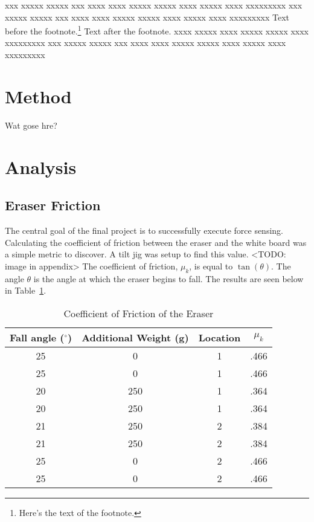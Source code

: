 \documentclass[12pt]{article}
\begin{document}
    xxx xxxxx xxxxx xxx xxxx xxxx xxxxx xxxxx xxxx xxxxx xxxx xxxxxxxxx
    xxx xxxxx xxxxx xxx xxxx xxxx xxxxx xxxxx xxxx xxxxx xxxx xxxxxxxxx
    Text before the footnote.\footnote{Here's the text of the footnote.}
    Text after the footnote. xxxx xxxxx xxxx xxxxx xxxxx xxxx xxxxxxxxx
    xxx xxxxx xxxxx xxx xxxx xxxx xxxxx xxxxx xxxx xxxxx xxxx xxxxxxxxx

    
		\section{Method}

			Wat gose hre?
	
    \section{Analysis}
        \subsection{Eraser Friction}

				The central goal of the final project is to successfully execute force sensing.
				Calculating the coefficient of friction between the eraser and the white board was a simple metric to discover.
				A tilt jig was setup to find this value. <TODO: image in appendix> The coefficient of friction,
				$\mu_k$, is equal to $\tan(\theta)$. The angle $\theta$ is the angle at which the eraser begins to fall. The results are seen below in Table~\ref{tab:eraser_friction}.
					\begin{table}
		  		\caption{Coefficient of Friction of the Eraser}
		  		\label{tab:eraser_friction}
		  		\vspace{0.15in}
		  		\begin{center}
		  		\begin{tabular}{|c|c|c|c|}
		  		\hline
		  		Fall angle ($^{\circ}$) & Additional Weight (g) & Location & $\mu_k$  \\
		  		\hline
					25 & 0 & 1 & .466 \\
					25 & 0 & 1 & .466 \\
					20 & 250 & 1 & .364 \\
					20 & 250 & 1 & .364 \\
					21 & 250 & 2 & .384 \\ 
					21 & 250 & 2 & .384 \\
					25 & 0 & 2 & .466 \\
					25 & 0 & 2 & .466 \\
					\hline
					\end{tabular}
					\end{center}  
					\end{table}
\end{document}

